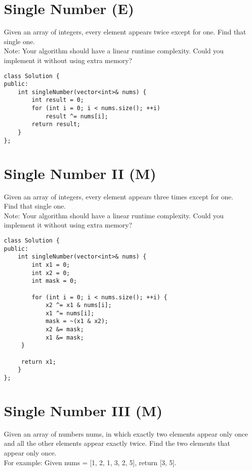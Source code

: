 \section{Single Number (E)}
Given an array of integers, every element appears twice except for one. Find that single one.\\

Note: Your algorithm should have a linear runtime complexity. Could you implement it without using extra memory? \\

\begin{lstlisting}
class Solution {
public:
    int singleNumber(vector<int>& nums) {
        int result = 0;
        for (int i = 0; i < nums.size(); ++i)
            result ^= nums[i];
        return result;
    }
};
\end{lstlisting}


\section{Single Number II (M)}
Given an array of integers, every element appears three times except for one. Find that single one. \\

Note: Your algorithm should have a linear runtime complexity. Could you implement it without using extra memory? \\

\begin{lstlisting}
class Solution {
public:
    int singleNumber(vector<int>& nums) {
        int x1 = 0;   
        int x2 = 0; 
        int mask = 0;

        for (int i = 0; i < nums.size(); ++i) {
            x2 ^= x1 & nums[i];
            x1 ^= nums[i];
            mask = ~(x1 & x2);
            x2 &= mask;
            x1 &= mask;
     }

     return x1;
    }
};
\end{lstlisting}


\section{Single Number III (M)}
Given an array of numbers nums, in which exactly two elements appear only once and all the other elements appear exactly twice. Find the two elements that appear only once. \\

For example: Given nums = [1, 2, 1, 3, 2, 5], return [3, 5].\\

